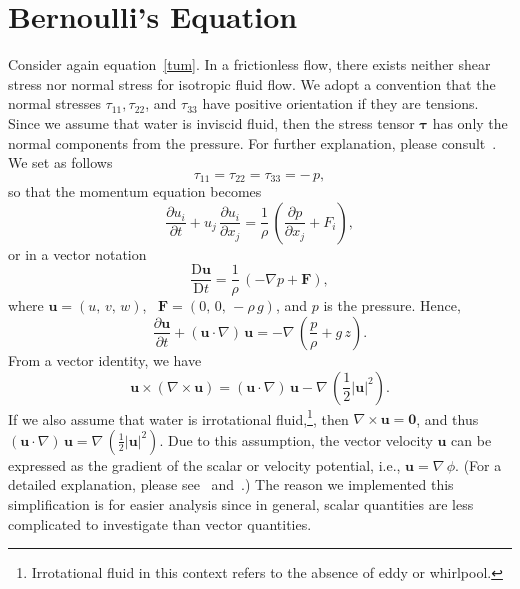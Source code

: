 \documentclass[12pt,a4paper]{report}
\begin{document}
\section{Bernoulli's Equation} 			\label{bernoulli}

Consider again equation~\eqref{tum}. In a frictionless flow, there exists neither shear stress nor normal stress for isotropic fluid flow.
We adopt a convention that the normal stresses $\tau_{11}, \tau_{22}$, and $\tau_{33}$ have positive orientation if they are tensions.
Since we assume that water is inviscid fluid, then the stress tensor $\mathbf{\tau}$ has only the normal components from the pressure.
For further explanation, please consult~\cite{hwf,kjp,njn}. We set as follows
\begin{equation}
\tau_{11} = \tau_{22} = \tau_{33} = -\,p,
\end{equation}
so that the momentum equation becomes
\begin{equation}
\frac{\partial u_{i} }{\partial t} + u_{j} \, \frac{\partial u_{i}}{\partial x_{j}} = \frac{1}{\rho} \, \left(\frac{\partial p}{\partial x_{j}} + F_{i} \right),
\end{equation}
or in a vector notation
\begin{equation}
\frac{\mathrm{D} \mathbf{u}}{\mathrm{D}t} = \frac{1}{\rho} \, \left(-\nabla p + \mathbf{F} \right),
\end{equation}
where $\mathbf{u} = (u,\,v,\,w)$, \ $\mathbf{F} = (0,\, 0,\, -\rho \,g)$, and $p$ is the pressure. Hence,
\begin{equation}
\frac{\partial \mathbf{u}}{\partial t} + (\mathbf{u} \cdot \nabla) \, \mathbf{u} = -\nabla \, \left(\frac{p}{\rho} + g \,z \right).
\end{equation}
From a vector identity, we have
\begin{equation}
\mathbf{u} \times (\nabla \times \mathbf{u}) = (\mathbf{u} \cdot \nabla) \, \mathbf{u} - \nabla \, \left(\frac{1}{2} \left|\mathbf{u} \right|^2 \right).
\end{equation}
If we also assume that water is irrotational fluid,\footnote[1]{Irrotational fluid in this context refers to the absence of eddy or whirlpool.}, then $\nabla \times
\mathbf{u} = \mathbf{0} \label{curl}$, and thus $(\mathbf{u} \cdot \nabla) \, \mathbf{u} = \nabla \, \left(\frac{1}{2} \left|\mathbf{u} \right|^2 \right)$.
Due to this assumption, the vector velocity $\mathbf{u}$ can be expressed as the gradient of the scalar or velocity potential, i.e., $\mathbf{u} = \nabla\,\phi$.
(For a detailed explanation, please see~\cite{drg} and~\cite{lld}.) The reason we implemented this simplification is for easier analysis since in general, scalar quantities are less complicated to investigate than vector quantities.
\end{document}

